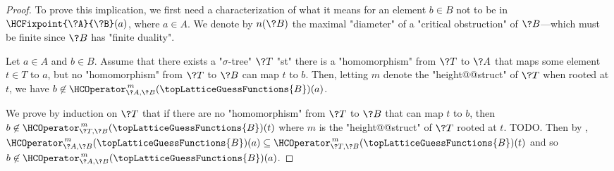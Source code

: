 \begin{proof}
	To prove this implication, we first need a characterization of
	what it means for an element $b\in B$ not to be in $\HCFixpoint{\?A}{\?B}(a)$,
	where $a\in A$.
	We denote by $n(\?B)$ the maximal "diameter" of a "critical obstruction" of $\?B$---which
	must be finite since $\?B$ has "finite duality".
	\begin{claim}
		\AP\label{claim:hyperedge-consistency-uniform-convergence-tree-witnesses}
		Let $a\in A$ and $b\in B$. Assume that there exists a "$\sigma$-tree" $\?T$ "st" there is a "homomorphism" from $\?T$ to $\?A$ that maps some element $t \in T$ to $a$, but no "homomorphism" from $\?T$ to $\?B$
		can map $t$ to $b$. Then, letting $m$ denote the "height@@struct" of $\?T$ when rooted
		at $t$, we have $b \not\in \HCOperator^{\,m}_{\?A,\?B}(\topLatticeGuessFunctions{B})(a)$.
	\end{claim}
	We prove by induction on $\?T$ that if there are no "homomorphism" from $\?T$ to $\?B$
	that can map $t$ to $b$, then $b \not\in \HCOperator^{\,m}_{\?T,\?B}(\topLatticeGuessFunctions{B})(t)$ where $m$ is the "height@@struct" of $\?T$ rooted at $t$.
	TODO.
	Then by , 
	$\HCOperator^{\,m}_{\?A,\?B}(\topLatticeGuessFunctions{B})(a) \subseteq
	\HCOperator^{\,m}_{\?T,\?B}(\topLatticeGuessFunctions{B})(t)$ and so
	$b \not\in \HCOperator^{\,m}_{\?A,\?B}(\topLatticeGuessFunctions{B})(a)$.


\end{proof}
